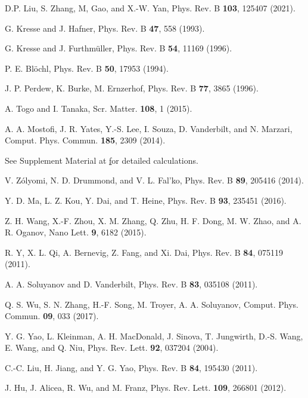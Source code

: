 \documentclass[aps,prl,twocolumn,showpacs,superscriptaddress]{revtex4-1}
\begin{document}
\begin{thebibliography}{99}
D.P. Liu, S. Zhang, M, Gao, and X.-W. Yan, {Phys. Rev. B \textbf{103}, 125407 (2021)}.

G. Kresse and J. Hafner, {Phys. Rev. B \textbf{47}, 558 (1993)}.

G. Kresse and J. Furthmüller, {Phys. Rev. B \textbf{54}, 11169 (1996)}.

P. E. Blöchl, {Phys. Rev. B \textbf{50}, 17953 (1994)}.

J. P. Perdew, K. Burke, M. Ernzerhof, {Phys. Rev. B \textbf{77}, 3865 (1996)}.

A. Togo and I. Tanaka, {Scr. Matter. \textbf{108}, 1 (2015)}.

A. A. Mostofi, J. R. Yates, Y.-S. Lee, I. Souza, D. Vanderbilt, and N. Marzari, {Comput. Phys. Commun. \textbf{185}, 2309 (2014)}.

See Supplement Material at \href{https://www.sciencedirect.com/science/article/abs/pii/S001046551400157X?via\%3Dihub} for detailed calculations.

V. Zólyomi, N. D. Drummond, and V. L. Fal'ko, {Phys. Rev. B \textbf{89}, 205416 (2014)}.

Y. D. Ma, L. Z. Kou, Y. Dai, and T. Heine, {Phys. Rev. B \textbf{93}, 235451 (2016)}.

Z. H. Wang, X.-F. Zhou, X. M. Zhang, Q. Zhu, H. F. Dong, M. W. Zhao, and A. R. Oganov, {Nano Lett. \textbf{9}, 6182 (2015)}.

R. Y, X. L. Qi, A. Bernevig, Z. Fang, and Xi. Dai, {Phys. Rev. B \textbf{84}, 075119 (2011)}.

A. A. Soluyanov and D. Vanderbilt, {Phys. Rev. B \textbf{83}, 035108 (2011)}.

Q. S. Wu, S. N. Zhang, H.-F. Song, M. Troyer, A. A. Soluyanov, {Comput. Phys. Commun. \textbf{09}, 033 (2017)}.

Y. G. Yao, L. Kleinman, A. H. MacDonald, J. Sinova, T. Jungwirth, D.-S. Wang, E. Wang, and Q. Niu, {Phys. Rev. Lett. \textbf{92}, 037204 (2004)}.

C.-C. Liu, H. Jiang, and Y. G. Yao, {Phys. Rev. B \textbf{84}, 195430 (2011)}.

J. Hu, J. Alicea, R. Wu, and M. Franz, {Phys. Rev. Lett. \textbf{109}, 266801 (2012)}.

\end{thebibliography}
\end{document}
